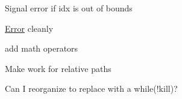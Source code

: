 \begin{DoxyRefList}
Signal error if idx is out of bounds  
\item[\label{todo__todo000026}%
\Hypertarget{todo__todo000026}%
Member \hyperlink{classnta_1_1utils_1_1Json_a905d67b125a7aadd771bb74a1bb63f34}{nta\+:\+:utils\+:\+:Json\+:\+:tokenize} (std\+::string curr)]\hyperlink{structnta_1_1Error}{Error} cleanly  
\item[\label{todo__todo000006}%
\Hypertarget{todo__todo000006}%
Class \hyperlink{classnta_1_1utils_1_1JsonNum}{nta\+:\+:utils\+:\+:Json\+Num} ]add math operators 
\item[\label{todo__todo000028}%
\Hypertarget{todo__todo000028}%
Member \hyperlink{classnta_1_1utils_1_1Path_aa124dc05466b3f681d02579fa0022a6a}{nta\+:\+:utils\+:\+:Path\+:\+:parent} () const]Make work for relative paths  
\item[\label{todo__todo000032}%
\Hypertarget{todo__todo000032}%
Member \hyperlink{classnta_1_1utils_1_1ThreadPool_a2ca98ba5ed4510e5aac90c0507859b8d}{nta\+:\+:utils\+:\+:Thread\+Pool\+:\+:dispatcher} ()]Can I reorganize to replace with a while(!kill)? 
\end{DoxyRefList}